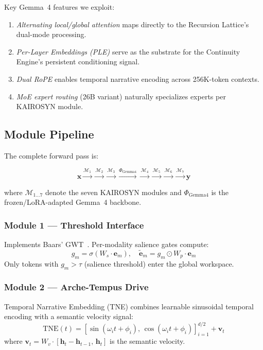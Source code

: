 \documentclass[conference]{IEEEtran}
\begin{document}
Key Gemma~4 features we exploit:
\begin{enumerate}
  \item \emph{Alternating local/global attention} maps directly to the
        Recursion Lattice's dual-mode processing.
  \item \emph{Per-Layer Embeddings (PLE)} serve as the substrate for the
        Continuity Engine's persistent conditioning signal.
  \item \emph{Dual RoPE} enables temporal narrative encoding across
        256K-token contexts.
  \item \emph{MoE expert routing} (26B variant) naturally specializes
        experts per KAIROSYN module.
\end{enumerate}

\subsection{Module Pipeline}

The complete forward pass is:

\begin{equation}
\mathbf{x} \xrightarrow{\mathcal{M}_1} \xrightarrow{\mathcal{M}_2}
\xrightarrow{\mathcal{M}_3} \xrightarrow{\Phi_{\text{Gemma4}}}
\xrightarrow{\mathcal{M}_4} \xrightarrow{\mathcal{M}_5}
\xrightarrow{\mathcal{M}_6} \xrightarrow{\mathcal{M}_7} \mathbf{y}
\end{equation}

where $\mathcal{M}_{1\ldots7}$ denote the seven KAIROSYN modules and
$\Phi_{\text{Gemma4}}$ is the frozen/LoRA-adapted Gemma~4 backbone.

\subsubsection{Module 1 --- Threshold Interface}
Implements Baars' GWT~\cite{baars1988}. Per-modality salience gates compute:
\begin{equation}
g_m = \sigma\!\left(W_s \cdot \mathbf{e}_m\right), \quad
\tilde{\mathbf{e}}_m = g_m \odot W_p \cdot \mathbf{e}_m
\end{equation}
Only tokens with $g_m > \tau$ (salience threshold) enter the global workspace.

\subsubsection{Module 2 --- Arche-Tempus Drive}
Temporal Narrative Embedding (TNE) combines learnable sinusoidal temporal
encoding with a semantic velocity signal:
\begin{equation}
\text{TNE}(t) = [\sin(\omega_i t + \phi_i),\, \cos(\omega_i t + \phi_i)]_{i=1}^{d/2}
+ \mathbf{v}_t
\end{equation}
where $\mathbf{v}_t = W_v \cdot [\mathbf{h}_t - \mathbf{h}_{t-1},\, \mathbf{h}_t]$
is the semantic velocity.
\end{document}

